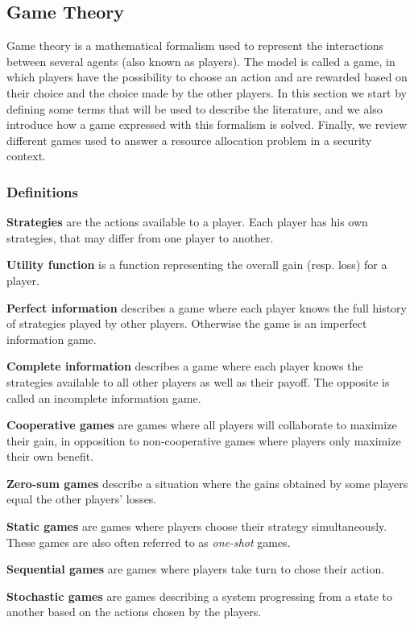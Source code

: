 \subsection{Game Theory}

Game theory is a mathematical formalism used to represent the interactions between several agents (also known as players).
The model is called a game, in which players have the possibility to choose an action and are rewarded based on their choice and the choice made by the other players.
In this section we start by defining some terms that will be used to describe the literature, and we also introduce how a game expressed with this formalism is solved. Finally, we review different games used to answer a resource allocation problem in a security context.

\subsubsection{Definitions}

\textbf{Strategies} are the actions available to a player. Each player has his own strategies, that may differ from one player to another.

\textbf{Utility function} is a function representing the overall gain (resp. loss) for a player.

\textbf{Perfect information} describes a game where each player knows the full history of strategies played by other players. Otherwise the game is an imperfect information game.

\textbf{Complete information} describes a game where each player knows the strategies available to all other players as well as their payoff. The opposite is called an incomplete information game.

\textbf{Cooperative games} are games where all players will collaborate to maximize their gain, in opposition to non-cooperative games where players only maximize their own benefit.

\textbf{Zero-sum games} describe a situation where the gains obtained by some players equal the other players' losses.

\textbf{Static games} are games where players choose their strategy simultaneously. These games are also often referred to as \textit{one-shot} games.

\textbf{Sequential games} are games where players take turn to chose their action.

\textbf{Stochastic games} are games describing a system progressing from a state to another based on the actions chosen by the players.

